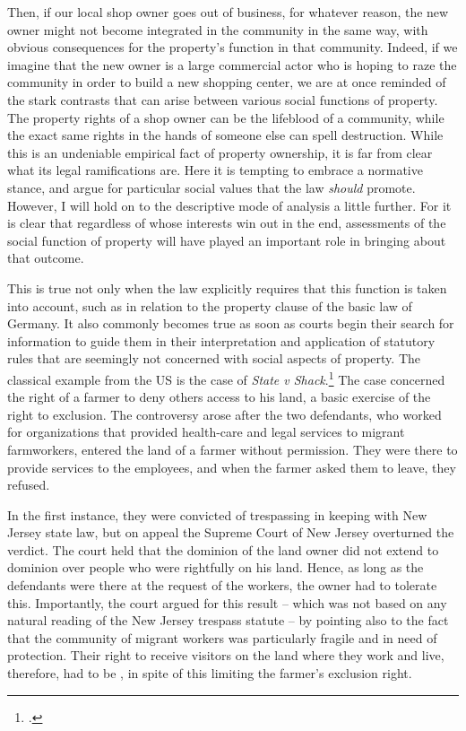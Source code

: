 Then, if our local shop owner goes out of business, for whatever reason, the new owner might not become integrated in the community in the same way, with obvious consequences for the property's function in that community. Indeed, if we imagine that the new owner is a large commercial actor who is hoping to raze the community in order to build a new shopping center, we are at once reminded of the stark contrasts that can arise between various social functions of property. The property rights of a shop owner can be the lifeblood of a community, while the exact same rights in the hands of someone else can spell destruction. While this is an undeniable empirical fact of property ownership, it is far from clear what its legal ramifications are. Here it is tempting to embrace a normative stance, and argue for particular social values that the law {\it should} promote. However, I will hold on to the descriptive mode of analysis a little further. For it is clear that regardless of whose interests win out in the end, assessments of the social function of property will have played an important role in bringing about that outcome.

This is true not only when the law explicitly requires that this function is taken into account, such as in relation to the property clause of the basic law of Germany. It also commonly becomes true as soon as courts begin their search for information to guide them in their interpretation and application of statutory rules that are seemingly not concerned with social aspects of property. The classical example from the US is the case of {\it State v Shack}.\footcite{shack71} The case concerned the right of a farmer to deny others access to his land, a basic exercise of the right to exclusion. The controversy arose after the two defendants, who worked for organizations that provided health-care and legal services to migrant farmworkers, entered the land of a farmer without permission. They were there to provide services to the  employees, and when the farmer asked them to leave, they refused.

In the first instance, they were convicted of trespassing in keeping with New Jersey state law, but on appeal the Supreme Court of New Jersey overturned the verdict. The court held that the dominion of the land owner did not extend to dominion over people who were rightfully on his land. Hence, as long as the defendants were there at the request of the workers, the owner had to tolerate this. Importantly, the court argued for this result -- which was not based on any natural reading of the New Jersey trespass statute -- by pointing also to the fact that the community of migrant workers was particularly fragile and in need of protection. Their right to receive visitors on the land where they work and live, therefore, had to be , in spite of this limiting the farmer's exclusion right.

